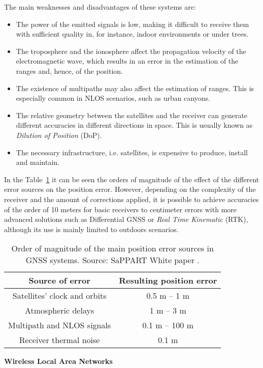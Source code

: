 \begin{description}
	The main weaknesses and disadvantages of these systems are:
	\begin{itemize}
		\item The power of the emitted signals is low, making it difficult to receive them with sufficient quality in, for instance, indoor environments or under trees.
		\item The troposphere and the ionosphere affect the propagation velocity of the electromagnetic wave, which results in an error in the estimation of the ranges and, hence, of the position.
		\item The existence of multipaths may also affect the estimation of ranges. This is especially common in NLOS scenarios, such as urban canyons.
		\item The relative geometry between the satellites and the receiver can generate different accuracies in different directions in space. This is usually known as \emph{Dilution of Position} (DoP).
		\item The necessary infrastructure, i.e. satellites, is expensive to produce, install and maintain.
	\end{itemize}	
	In the Table~\ref{table:ch2_GNSS_errors} it can be seen the orders of magnitude of the effect of the different error sources on the position error.
	However, depending on the complexity of the receiver and the amount of corrections applied, it is possible to achieve accuracies of the order of 10 meters for basic receivers to centimeter errors with more advanced solutions such as Differential GNSS or \emph{Real Time Kinematic} (RTK), although its use is mainly limited to outdoors scenarios.	
	\begin{table}[!t]
		\centering
		\begin{tabular}{c c}
			\hline
			\rowcolor{gray!25}
			\bfseries Source of error & \bfseries Resulting position error\\
			\hline
			Satellites' clock and orbits& 0.5 m – 1 m\\
			\hline
			Atmospheric delays&1 m – 3 m\\
			\hline
			Multipath and NLOS signals&0.1 m – 100 m\\
			\hline
			Receiver thermal noise&0.1 m\\
		\end{tabular}
		\caption[Order of magnitude of the main GNSS position error sources]{Order of magnitude of the main position error sources in GNSS systems. Source:  SaPPART White paper \cite{noauthor_cost_2015}.}	
		\label{table:ch2_GNSS_errors}	
	\end{table}			
	\newpage
	\item \textbf{Wireless Local Area Networks}
	

\end{description}
